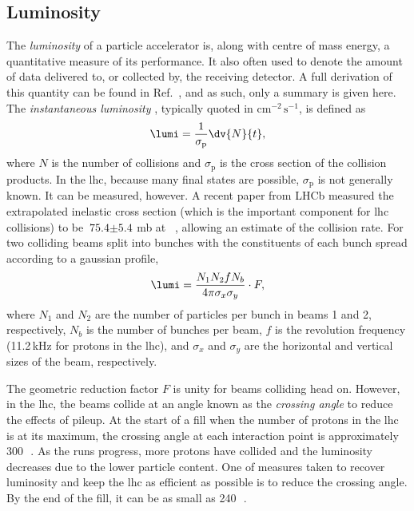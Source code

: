 



\subsection{Luminosity}
\label{subsec:luminosity}

The \emph{\gls{luminosity}} of a particle accelerator is, along with centre of mass energy, a quantitative measure of its performance. It also often used to denote the amount of data delivered to, or collected by, the receiving detector. A full derivation of this quantity can be found in Ref.~, and as such, only a summary is given here. The \emph{instantaneous luminosity} \lumi, typically quoted in $\text{cm}^{-2}\,\text{s}^{-1}$, is defined as
\begin{equation}
    \lumi = \frac{1}{\sigma_{\mathrm{p}}} \dv{N}{t},
    \label{eq:lumi_instantaneous}
\end{equation}
where $N$ is the number of collisions and $\sigma_{\mathrm{p}}$ is the cross section of the collision products. In the \acrshort{lhc}, because many final states are possible, $\sigma_{\mathrm{p}}$ is not generally known. It can be measured, however. A recent paper from LHCb measured the extrapolated inelastic cross section (which is the important component for \acrshort{lhc} collisions) to be $\text{75.4} \pm \text{5.4}$\,mb at \comruntwo~\cite{Aaij:2018okq}, allowing an estimate of the collision rate. For two colliding beams split into bunches with the constituents of each bunch spread according to a gaussian profile,
\begin{equation}
    \lumi = \frac{N_1 N_2 f N_b}{4 \pi \sigma_x \sigma_y} \cdot F, %
    \label{eq:lumi_inst_head_on_colliding_beams}
\end{equation}
where $N_1$ and $N_2$ are the number of particles per bunch in beams 1 and 2, respectively, $N_b$ is the number of bunches per beam, $f$ is the revolution frequency (11.2\,kHz for protons in the \acrshort{lhc}), and $\sigma_x$ and $\sigma_y$ are the horizontal and vertical sizes of the beam, respectively.

The geometric reduction factor $F$ is unity for beams colliding head on. However, in the \acrshort{lhc}, the beams collide at an angle known as the \emph{crossing angle} to reduce the effects of \gls{pileup}. At the start of a fill when the number of protons in the \acrshort{lhc} is at its maximum, the crossing angle at each interaction point is approximately 300\,\si{\micro{}}. As the runs progress, more protons have collided and the luminosity decreases due to the lower particle content. One of measures taken to recover luminosity and keep the \acrshort{lhc} as efficient as possible is to reduce the crossing angle. By the end of the fill, it can be as small as 240\,\si{\micro{}}.

